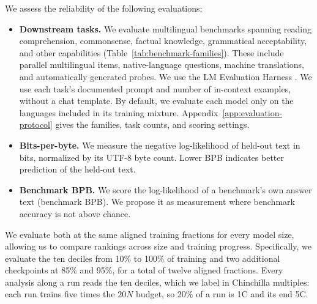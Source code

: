 We assess the reliability of the following evaluations:
\begin{itemize}[leftmargin=15pt,noitemsep,topsep=0pt]

\item \textbf{Downstream tasks.} We evaluate \nbenchmarks multilingual benchmarks spanning reading comprehension, commonsense, factual knowledge, grammatical acceptability, and other capabilities (Table~\ref{tab:benchmark-families}). These include parallel multilingual items, native-language questions, machine translations, and automatically generated probes. We use the LM Evaluation Harness \citep{gao_framework_2021}. We use each task's documented prompt and number of in-context examples, without a chat template.
By default, we evaluate each model only on the languages included in its training mixture.
Appendix~\ref{app:evaluation-protocol} gives the families, task counts, and scoring settings.

\item \textbf{Bits-per-byte.} We measure the negative log-likelihood of held-out text in bits, normalized by its UTF-8 byte count.
Lower BPB indicates better prediction of the held-out text. 

\item \textbf{Benchmark BPB.} We score the log-likelihood of a benchmark's own answer text (benchmark BPB). We propose it as measurement where benchmark accuracy is not above chance.
\end{itemize}

We evaluate both at the same aligned training fractions for every model size, allowing us to compare rankings across size and training progress.
Specifically, we evaluate the ten deciles from 10\% to 100\% of training and two additional checkpoints at 85\% and 95\%, for a total of twelve aligned fractions. Every analysis along a run reads the ten deciles, which we label in Chinchilla multiples: each run trains five times the $20N$ budget, so 20\% of a run is 1C and its end 5C. %


